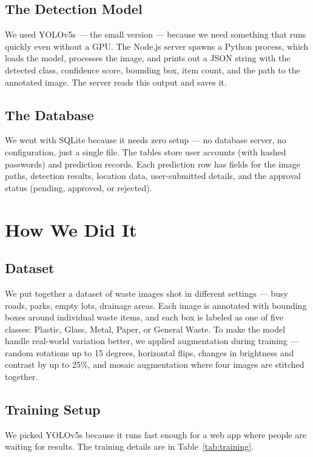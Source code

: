 \documentclass[conference]{IEEEtran}
\begin{document}
\subsection{The Detection Model}
We used YOLOv5s — the small version — because we need something that runs quickly even without a GPU. The Node.js server spawns a Python process, which loads the model, processes the image, and prints out a JSON string with the detected class, confidence score, bounding box, item count, and the path to the annotated image. The server reads this output and saves it.

\subsection{The Database}
We went with SQLite because it needs zero setup — no database server, no configuration, just a single file. The tables store user accounts (with hashed passwords) and prediction records. Each prediction row has fields for the image paths, detection results, location data, user-submitted details, and the approval status (pending, approved, or rejected).

\section{How We Did It}

\subsection{Dataset}
We put together a dataset of waste images shot in different settings — busy roads, parks, empty lots, drainage areas. Each image is annotated with bounding boxes around individual waste items, and each box is labeled as one of five classes: Plastic, Glass, Metal, Paper, or General Waste. To make the model handle real-world variation better, we applied augmentation during training — random rotations up to 15 degrees, horizontal flips, changes in brightness and contrast by up to 25\%, and mosaic augmentation where four images are stitched together.

\subsection{Training Setup}
We picked YOLOv5s because it runs fast enough for a web app where people are waiting for results. The training details are in Table~\ref{tab:training}.
\end{document}
